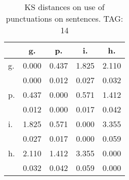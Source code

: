 \begin{table}[h!]
\begin{center}
\begin{tabular}{| l | c | c | c | c |}\hline
 & g. & p. & i. & h. \\\hline
g. & 0.000  & 0.437  & 1.825  & 2.110 \\\hline
 & 0.000  & 0.012  & 0.027  & 0.032 \\\hline
p. & 0.437  & 0.000  & 0.571  & 1.412 \\\hline
 & 0.012  & 0.000  & 0.017  & 0.042 \\\hline
i. & 1.825  & 0.571  & 0.000  & 3.355 \\\hline
 & 0.027  & 0.017  & 0.000  & 0.059 \\\hline
h. & 2.110  & 1.412  & 3.355  & 0.000 \\\hline
 & 0.032  & 0.042  & 0.059  & 0.000 \\\hline
\end{tabular}
\caption{KS distances on use of punctuations on sentences. TAG: 14}
\end{center}
\end{table}